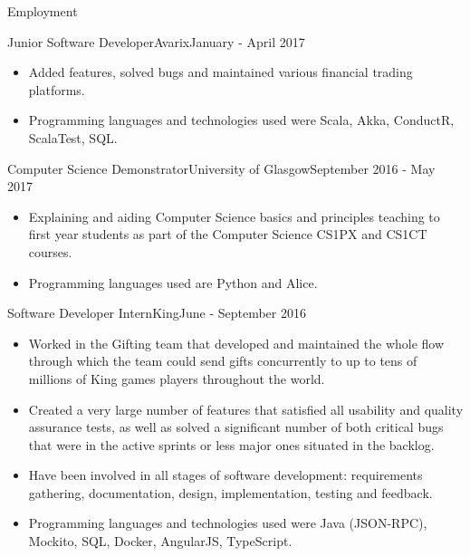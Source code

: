 \documentclass[]{cv}
\begin{document}
\begin{cvsection}{Employment}
		\begin{cvsubsection}{Junior Software Developer}{Avarix}{January - April 2017}
			\begin{itemize}
				\item Added features, solved bugs and maintained various financial trading platforms.
				\item Programming languages and technologies used were Scala, Akka, ConductR, ScalaTest, SQL.
			\end{itemize}
		\end{cvsubsection}

		\begin{cvsubsection}{Computer Science Demonstrator}{University of Glasgow}{September 2016 - May 2017}
			\begin{itemize}
				\item Explaining and aiding Computer Science basics and principles teaching to first year students as part of the Computer Science CS1PX and CS1CT courses.
				\item Programming languages used are Python and Alice.
			\end{itemize}
		\end{cvsubsection}

		\begin{cvsubsection}{Software Developer Intern}{King}{June - September 2016}
			\begin{itemize}
				\item Worked in the Gifting team that developed and maintained the whole flow through which the team could send gifts concurrently to up to tens of 
					millions of King games players throughout the world.
				\item Created a very large number of features that satisfied all usability and quality assurance tests, as well as solved a significant number of 
					both critical bugs that were in the active sprints or less major ones situated in the backlog.
				\item Have been involved in all stages of software development: requirements gathering, documentation, design, implementation, testing and feedback.
				\item Programming languages and technologies used were Java (JSON-RPC), Mockito, SQL, Docker, AngularJS, TypeScript.
			\end{itemize}
		\end{cvsubsection}


\end{cvsection}
\end{document}
